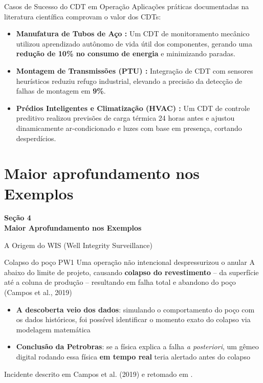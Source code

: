 \documentclass[aspectratio=169,xcolor=dvipsnames]{beamer}
\begin{document}
\begin{frame}{Casos de Sucesso do CDT em Operação}
    Aplicações práticas documentadas na literatura científica comprovam o valor dos CDTs:
    \vspace{0.4em}
    \begin{itemize}\setlength\itemsep{4pt}
        \item \textbf{Manufatura de Tubos de Aço \cite{zheng2022emergence}:} Um CDT de monitoramento mecânico utilizou aprendizado autônomo de vida útil dos componentes, gerando uma \textbf{redução de 10\% no consumo de energia} e minimizando paradas.
        \item \textbf{Montagem de Transmissões (PTU) \cite{zheng2022emergence}:} Integração de CDT com sensores heurísticos reduziu refugo industrial, elevando a precisão da detecção de falhas de montagem em \textbf{9\%}.
        \item \textbf{Prédios Inteligentes e Climatização (HVAC) \cite{elmokhtari2022hvac}:} Um CDT de controle preditivo realizou previsões de carga térmica 24 horas antes e ajustou dinamicamente ar-condicionado e luzes com base em presença, cortando desperdícios.
    \end{itemize}
\end{frame}


\section{Maior aprofundamento nos Exemplos}

\begin{frame}[plain]
    \vfill
    \centering
    {\Large\textcolor{dexpiBlue}{\textbf{Seção 4}}}\\[0.8em]
    {\LARGE\textbf{Maior Aprofundamento nos Exemplos}}\\[0.6em]
    \vfill
\end{frame}

\begin{frame}{A Origem do WIS (Well Integrity Surveillance)}
    \begin{alertblock}{Colapso do poço PW1}
        Uma operação não intencional despressurizou o anular A abaixo do limite de projeto, causando \textbf{colapso do revestimento} -- da superfície até a coluna de produção -- resultando em falha total e abandono do poço (Campos et al., 2019)
    \end{alertblock}
    \begin{itemize}
        \item \textbf{A descoberta veio dos dados}: simulando o comportamento do poço com os dados históricos, foi possível identificar o momento exato do colapso via modelagem matemática
        \item \textbf{Conclusão da Petrobras}: se a física explica a falha \textit{a posteriori}, um gêmeo digital rodando essa física \textbf{em tempo real} teria alertado antes do colapso
    \end{itemize}

    \vfill
    \footnotesize Incidente descrito em Campos et al. (2019) e retomado em \cite{otc2020}.
\end{frame}
\end{document}
